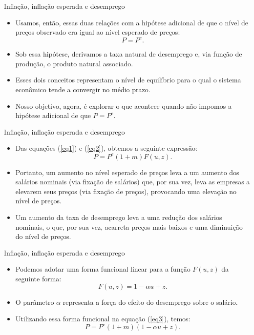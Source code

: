 \documentclass[10pt]{beamer}
\begin{document}
\begin{frame}{Inflação, inflação esperada e desemprego}
    \begin{itemize}
        \item Usamos, então, essas duas relações com a hipótese adicional de que o nível de preços observado era igual ao nível esperado de preços:
        \[
        P = P^e.
        \]
        \bigskip
        \item Sob essa hipótese, derivamos a taxa natural de desemprego e, via função de produção, o produto natural associado.
        \bigskip
        \item Esses dois conceitos representam o nível de equilíbrio para o qual o sistema econômico tende a convergir no médio prazo.
        \bigskip
        \item Nosso objetivo, agora, é explorar o que acontece quando não impomos a hipótese adicional de que $P = P^e$.
    \end{itemize}
\end{frame}

\begin{frame}{Inflação, inflação esperada e desemprego}
    \begin{itemize}
        \item Das equações (\ref{eq1}) e (\ref{eq2}), obtemos a seguinte expressão:
        \begin{equation}
            P = P^e (1 + m) F(u,z).
            \label{eq3}
        \end{equation}
        \bigskip
        \item Portanto, um aumento no nível esperado de preços leva a um aumento dos salários nominais (via fixação de salários) que, por sua vez, leva as empresas a elevarem seus preços (via fixação de preços), provocando uma elevação no nível de preços.
        \bigskip
        \item Um aumento da taxa de desemprego leva a uma redução dos salários nominais, o que, por sua vez, acarreta preços mais baixos e uma diminuição do nível de preços.
    \end{itemize}
\end{frame}

\begin{frame}{Inflação, inflação esperada e desemprego}
    \begin{itemize}
        \item Podemos adotar uma forma funcional linear para a função $F(u,z)$ da seguinte forma:
        \[
        F(u,z) = 1 - \alpha u + z.
        \]
        \bigskip
        \item O parâmetro $\alpha$ representa a força do efeito do desemprego sobre o salário.
        \bigskip
        \item Utilizando essa forma funcional na equação (\ref{eq3}), temos:
        \begin{equation}
            P = P^e (1 + m) (1-\alpha u + z).
            \label{eq4}
        \end{equation}
    \end{itemize}
\end{frame}
\end{document}
